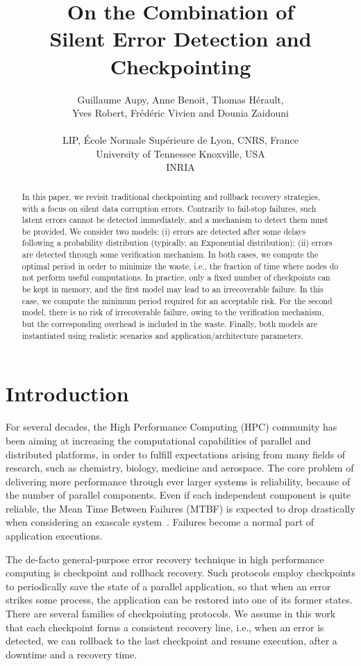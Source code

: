 \documentclass[10pt,table]{article}
\title{On the Combination of \\ [-.3cm]
Silent Error Detection and Checkpointing}
\author{Guillaume Aupy, Anne Benoit, Thomas H\'erault,\\
 Yves Robert, Fr\'ed\'eric Vivien and Dounia Zaidouni\\~\\
  LIP,  \'Ecole Normale Sup\'erieure de Lyon, CNRS, France\\
  University of Tennessee Knoxville, USA\\
  INRIA
}
\begin{document}
\maketitle

\begin{abstract}
In this paper, we revisit traditional checkpointing and rollback recovery strategies, 
with a focus on silent data corruption errors. Contrarily to fail-stop failures, 
such latent errors cannot be detected immediately, and a mechanism to detect them
must be provided. We consider two models: (i) errors are detected after some delays following a
probability distribution (typically, an Exponential distribution); (ii) errors are detected through some verification mechanism. In both cases, we compute
the optimal period in order to minimize the waste, i.e., the fraction of time
where nodes do not perform useful computations. In practice, only a fixed number of checkpoints 
can be kept in memory, and the first model may lead to an irrecoverable failure.  
In this case, we compute the minimum period
required for an acceptable risk. For the second model, there is no risk of irrecoverable failure, owing to the
verification mechanism, but the corresponding overhead is included in the waste.
Finally, both models are instantiated using realistic scenarios and application/architecture parameters.
\end{abstract}


\section{Introduction}
\label{sec.intro}

For several decades, the High Performance Computing (HPC) community has been aiming
at increasing the computational capabilities of parallel and distributed platforms,
in order to fulfill expectations  arising from many fields of research, such as chemistry, biology,
medicine and aerospace. The core problem of delivering more performance through ever
larger systems is reliability, because of the number of parallel components. Even if each
independent component is quite reliable, the Mean Time Between Failures (MTBF) 
is expected to drop drastically when considering an exascale system~\cite{IESP-Exascale}. 
Failures become a normal part of application executions. 

The de-facto general-purpose error recovery technique in high performance computing is checkpoint 
and rollback recovery.  Such protocols employ checkpoints to periodically save the state of a 
parallel application, so that when an error strikes some process, the application can be
restored into one of its former states. There are several families of checkpointing protocols. 
We assume in this work that each checkpoint forms a consistent recovery line, i.e.,  
when an error is detected, we
can rollback to the last checkpoint and resume execution, after a downtime and a recovery time. 
\end{document}
